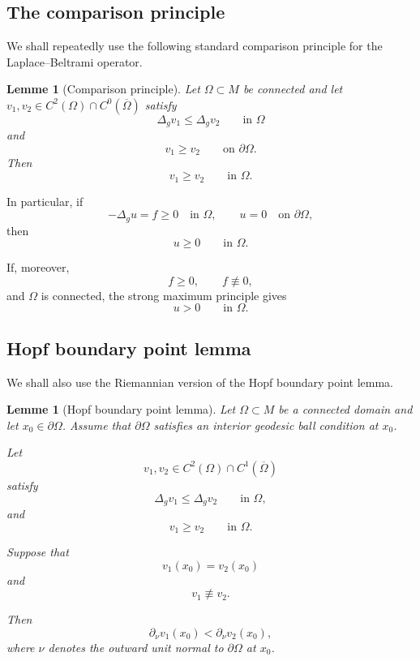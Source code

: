\documentclass{article}
\renewcommand{\boxed}[1]{#1}
\newtheorem{lemma}[theorem]{Lemme}
\begin{document}
\subsection{The comparison principle}
\label{subsec:comparison-principle}

We shall repeatedly use the following standard comparison principle
for the Laplace--Beltrami operator.

\begin{lemma}[Comparison principle]
\label{lem:comparison}
Let $\Omega\subset M$ be connected and let
$v_1,v_2\in C^2(\Omega)\cap C^0(\overline{\Omega})$ satisfy
\[
\Delta_g v_1\leq\Delta_g v_2
\qquad\text{in }\Omega
\]
and
\[
v_1\geq v_2
\qquad\text{on }\partial\Omega.
\]
Then
\[
v_1\geq v_2
\qquad\text{in }\Omega.
\]
\end{lemma}

In particular, if
\[
-\Delta_g u=f\geq0
\quad\text{in }\Omega,
\qquad
u=0
\quad\text{on }\partial\Omega,
\]
then
\[
u\geq0
\qquad\text{in }\Omega.
\]

If, moreover,
\[
f\geq0,
\qquad
f\not\equiv0,
\]
and $\Omega$ is connected, the strong maximum principle gives
\begin{equation}
u>0
\qquad\text{in }\Omega.
\label{eq:positive-state}
\end{equation}

\subsection{Hopf boundary point lemma}
\label{subsec:hopf}

We shall also use the Riemannian version of the Hopf boundary point
lemma.

\begin{lemma}[Hopf boundary point lemma]
\label{lem:hopf}
Let $\Omega\subset M$ be a connected domain and let
$x_0\in\partial\Omega$. Assume that $\partial\Omega$ satisfies an
interior geodesic ball condition at $x_0$.

Let
\[
v_1,v_2\in C^2(\Omega)\cap C^1(\overline{\Omega})
\]
satisfy
\[
\Delta_g v_1\leq\Delta_g v_2
\qquad\text{in }\Omega,
\]
and
\[
v_1\geq v_2
\qquad\text{in }\Omega.
\]

Suppose that
\[
v_1(x_0)=v_2(x_0)
\]
and
\[
v_1\not\equiv v_2.
\]

Then
\begin{equation}
\boxed{
\partial_\nu v_1(x_0)
<
\partial_\nu v_2(x_0),
}
\label{eq:hopf-normal}
\end{equation}
where $\nu$ denotes the outward unit normal to $\partial\Omega$ at
$x_0$.
\end{lemma}
\end{document}
